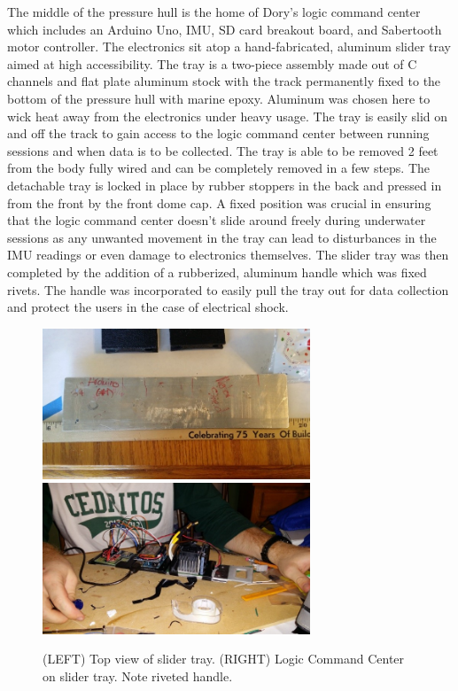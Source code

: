\documentclass{report}
\begin{document}
The middle of the pressure hull is the home of Dory’s logic command center which includes an Arduino Uno, IMU, SD card breakout board, and Sabertooth motor controller.  The electronics sit atop a hand-fabricated, aluminum slider tray aimed at high accessibility.  The tray is a two-piece assembly made out of C channels and flat plate aluminum stock with the track permanently fixed to the bottom of the pressure hull with marine epoxy.  Aluminum was chosen here to wick heat away from the electronics under heavy usage.  The tray is easily slid on and off the track to gain access to the logic command center between running sessions and when data is to be collected.  The tray is able to be removed 2 feet from the body fully wired and can be completely removed in a few steps.  The detachable tray is locked in place by rubber stoppers in the back and pressed in from the front by the front dome cap.  A fixed position was crucial in ensuring that the logic command center doesn’t slide around freely during underwater sessions as any unwanted movement in the tray can lead to disturbances in the IMU readings or even damage to electronics themselves.  The slider tray was then completed by the addition of a rubberized, aluminum handle which was fixed rivets.  The handle was incorporated to easily pull the tray out for data collection and protect the users in the case of electrical shock.
\begin{figure}[h]
\centering
\includegraphics[width=8cm]{"tray"}
\includegraphics[width=8cm]{"brains"}
\caption{(LEFT) Top view of slider tray. (RIGHT) Logic Command Center on slider tray. Note riveted handle.}
\end{figure} 
\end{document}
